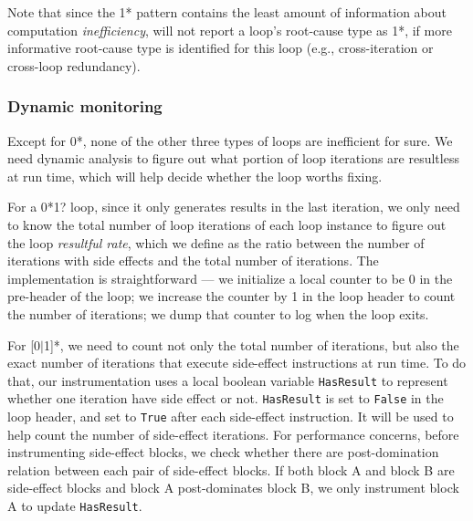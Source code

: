 Note that since the 1* pattern contains the least amount of information
about computation \textit{inefficiency}, \Tool will not report a loop's
root-cause type as 1*, if more informative root-cause type is identified 
for this loop (e.g., cross-iteration or cross-loop redundancy).

\subsubsection{Dynamic monitoring}
\label{sec:d_workless}

Except for 0*, none of the other three types of loops are inefficient for sure.
We need dynamic analysis to figure out what portion of loop iterations are
resultless at run time, which will help decide whether the loop worths fixing.

For a 0*1? loop, since it only generates results in the last iteration, we 
only need to know the total number of loop iterations of each loop instance
to figure out the loop
\textit{resultful rate}, which we define as the ratio between
the number of iterations with
side effects and the total number of iterations. 
The implementation is straightforward
--- we initialize a local counter to be 0 in the pre-header of the loop; we 
increase the counter by 1 in the loop header to count the number of 
iterations; we dump that counter to log when the loop exits.

For [0$|$1]*, we need to count not only the total number of iterations, but
also the exact number of iterations that execute side-effect instructions
at run time. 
To do that, our instrumentation uses a local boolean variable 
\texttt{HasResult} to represent whether one iteration have side effect or not. 
\texttt{HasResult} is set to \texttt{False} in the loop header, and set to
\texttt{True} after each side-effect instruction. It will be used to help
count the number of side-effect iterations. For performance concerns,
before instrumenting side-effect blocks, we check whether there are 
post-domination relation between each pair of side-effect blocks. 
If both block A and block B are side-effect blocks and block A post-dominates 
block B, we only instrument block A to update \texttt{HasResult}. 



